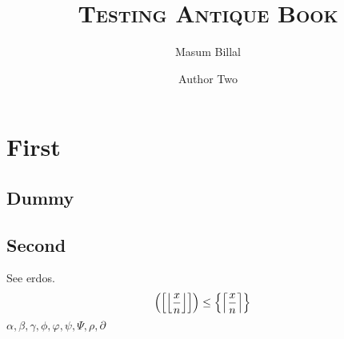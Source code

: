 \documentclass{antiquebook}
\author{Masum Billal \and Author Two}
\title{\scshape\textbf{Testing Antique Book}}
\begin{document}
	\frontmatter
	\maketitle
	\tableofcontents
	\mainmatter
	\chapter{First}
	\section{Dummy}
	\blindmathtrue
	\blindmathpaper
	\section{Second}
	\blindmathpaper
	See \gls{erdos}.
		\begin{align*}
			\left(\left[{\left\lfloor{\dfrac{x}{n}}\right\rfloor}\right]\right)
				& \leq \left\{\left\lceil{\dfrac{x}{n}}\right\rceil\right\}
		\end{align*}
	$\alpha,\beta,\gamma,\phi,\varphi,\psi,\Psi,\rho,\partial$
\end{document}

